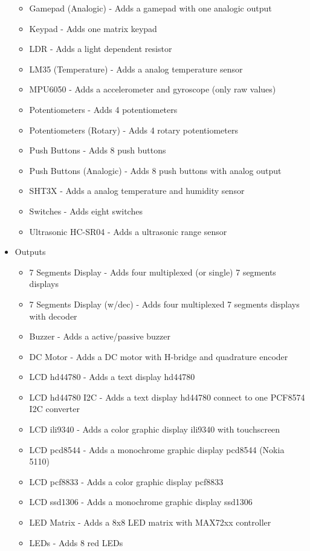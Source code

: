 \begin{itemize}
\begin{itemize}
  \item Gamepad (Analogic) - Adds a gamepad with one analogic output 
  \item Keypad -  Adds one matrix keypad
  \item LDR - Adds a light dependent resistor 
  \item LM35 (Temperature) - Adds a analog temperature sensor
  \item MPU6050 - Adds a accelerometer and gyroscope (only raw values)
  \item Potentiometers - Adds 4 potentiometers
  \item Potentiometers (Rotary) - Adds 4 rotary potentiometers
  \item Push Buttons - Adds 8 push buttons
  \item Push Buttons (Analogic) - Adds 8 push buttons with analog output
  \item SHT3X - Adds a analog temperature and humidity sensor
  \item Switches - Adds eight switches
  \item Ultrasonic HC-SR04 - Adds a ultrasonic range sensor
\end{itemize}
 \item{Outputs}
  \begin{itemize}
   \item 7 Segments Display -  Adds four multiplexed (or single) 7 segments displays
   \item 7 Segments Display (w/dec) -  Adds four multiplexed 7 segments displays with decoder
   \item Buzzer - Adds a active/passive buzzer
   \item DC Motor - Adds a DC motor with H-bridge and quadrature encoder 
   \item LCD hd44780 - Adds a text display hd44780
   \item LCD hd44780 I2C - Adds a text display hd44780 connect to one PCF8574 I2C converter
   \item LCD ili9340 - Adds a color graphic display ili9340 with touchscreen 
   \item LCD pcd8544 - Adds a monochrome graphic display pcd8544 (Nokia 5110)
   \item LCD pcf8833 - Adds a color graphic display pcf8833
   \item LCD ssd1306 - Adds a monochrome graphic display ssd1306
   \item LED Matrix - Adds a 8x8 LED matrix with MAX72xx controller 
   \item LEDs - Adds 8 red LEDs

\end{itemize}
\end{itemize}
